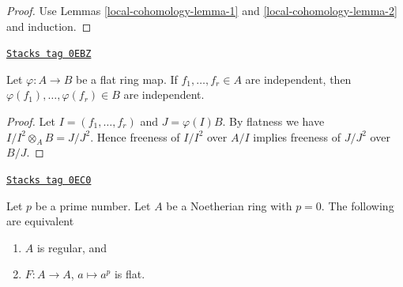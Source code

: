 \begin{proof}
Use Lemmas \ref{local-cohomology-lemma-1} and \ref{local-cohomology-lemma-2} and induction.
\end{proof}

\begin{lemma}
\label{local-cohomology-lemma-flat-extension-independent}
\href{https://stacks.math.columbia.edu/tag/0EBZ}{\texttt{Stacks tag 0EBZ}}

Let $\varphi : A \to B$ be a flat ring map.
If $f_1, \ldots, f_r \in A$ are independent, then
$\varphi(f_1), \ldots, \varphi(f_r) \in B$ are independent.
\end{lemma}

\begin{proof}
Let $I = (f_1, \ldots, f_r)$ and $J = \varphi(I)B$. By flatness we have
$I/I^2 \otimes_A B = J/J^2$. Hence freeness of $I/I^2$ over $A/I$
implies freeness of $J/J^2$ over $B/J$.
\end{proof}

\begin{lemma}[Kunz]

\label{local-cohomology-lemma-frobenius-flat-regular}
\href{https://stacks.math.columbia.edu/tag/0EC0}{\texttt{Stacks tag 0EC0}}

\begin{reference}
\cite{Kunz-flat}
\end{reference}
Let $p$ be a prime number.
Let $A$ be a Noetherian ring with $p = 0$.
The following are equivalent
\begin{enumerate}
\item $A$ is regular, and
\item $F : A \to A$, $a \mapsto a^p$ is flat.
\end{enumerate}
\end{lemma}

